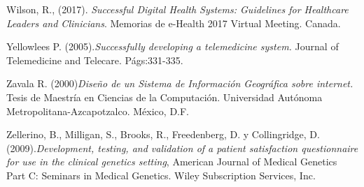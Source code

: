 \begin{thebibliography}{}
 Wilson, R., (2017). \textit{Successful Digital Health Systems: Guidelines for Healthcare Leaders and Clinicians}. Memorias de e-Health 2017 Virtual Meeting. Canada.

 Yellowlees P. (2005).\textit{Successfully developing a telemedicine system.} Journal of Telemedicine and Telecare. Págs:331-335.

 Zavala R. (2000)\textit{Diseño de un Sistema de Información Geográfica sobre internet.} Tesis de Maestría en Ciencias de la Computación. Universidad Autónoma Metropolitana-Azcapotzalco. México, D.F.


 Zellerino, B.,  Milligan, S., Brooks, R., Freedenberg, D. y Collingridge, D. (2009).\textit{Development, testing, and validation of a patient satisfaction questionnaire for use in the clinical genetics setting}, American Journal of Medical Genetics Part C: Seminars in Medical Genetics. Wiley Subscription Services, Inc.

\end{thebibliography}
